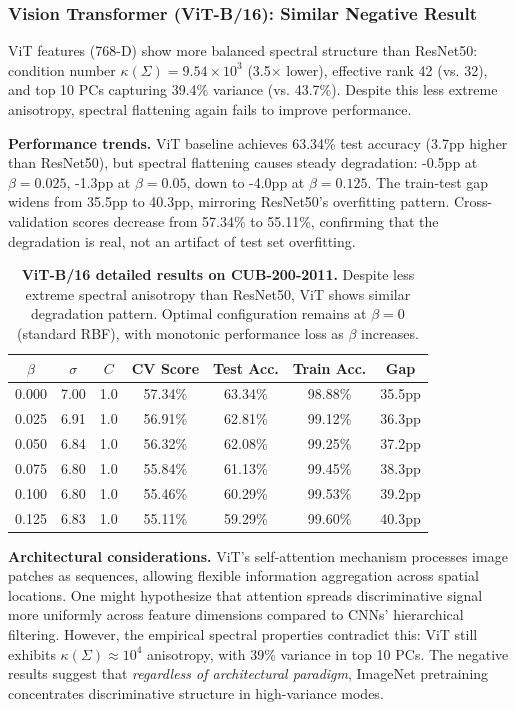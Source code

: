 \documentclass[11pt]{article}
\begin{document}
\subsubsection{Vision Transformer (ViT-B/16): Similar Negative Result}

ViT features (768-D) show more balanced spectral structure than ResNet50: condition number $\kappa(\Sigma) = 9.54 \times 10^3$ (3.5$\times$ lower), effective rank 42 (vs. 32), and top 10 PCs capturing 39.4\% variance (vs. 43.7\%). Despite this less extreme anisotropy, spectral flattening again fails to improve performance.

\textbf{Performance trends.} ViT baseline achieves 63.34\% test accuracy (3.7pp higher than ResNet50), but spectral flattening causes steady degradation: -0.5pp at $\beta=0.025$, -1.3pp at $\beta=0.05$, down to -4.0pp at $\beta=0.125$. The train-test gap widens from 35.5pp to 40.3pp, mirroring ResNet50's overfitting pattern. Cross-validation scores decrease from 57.34\% to 55.11\%, confirming that the degradation is real, not an artifact of test set overfitting.

\begin{table}[h]
\centering
\caption{\textbf{ViT-B/16 detailed results on CUB-200-2011.} Despite less extreme spectral anisotropy than ResNet50, ViT shows similar degradation pattern. Optimal configuration remains at $\beta=0$ (standard RBF), with monotonic performance loss as $\beta$ increases.}
\label{tab:vit_detail}
\begin{tabular}{ccccccc}
\toprule
$\beta$ & $\sigma$ & $C$ & CV Score & Test Acc. & Train Acc. & Gap \\
\midrule
0.000 & 7.00 & 1.0 & 57.34\% & 63.34\% & 98.88\% & 35.5pp \\
0.025 & 6.91 & 1.0 & 56.91\% & 62.81\% & 99.12\% & 36.3pp \\
0.050 & 6.84 & 1.0 & 56.32\% & 62.08\% & 99.25\% & 37.2pp \\
0.075 & 6.80 & 1.0 & 55.84\% & 61.13\% & 99.45\% & 38.3pp \\
0.100 & 6.80 & 1.0 & 55.46\% & 60.29\% & 99.53\% & 39.2pp \\
0.125 & 6.83 & 1.0 & 55.11\% & 59.29\% & 99.60\% & 40.3pp \\
\bottomrule
\end{tabular}
\end{table}

\textbf{Architectural considerations.} ViT's self-attention mechanism processes image patches as sequences, allowing flexible information aggregation across spatial locations. One might hypothesize that attention spreads discriminative signal more uniformly across feature dimensions compared to CNNs' hierarchical filtering. However, the empirical spectral properties contradict this: ViT still exhibits $\kappa(\Sigma) \approx 10^4$ anisotropy, with 39\% variance in top 10 PCs. The negative results suggest that \emph{regardless of architectural paradigm}, ImageNet pretraining concentrates discriminative structure in high-variance modes.
\end{document}
